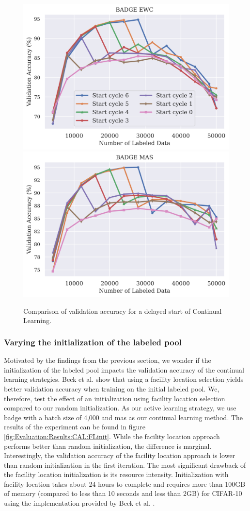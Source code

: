 \begin{figure}[h]
    \centering
    \includegraphics[width=0.45\linewidth]{images/results_CAL/delayed_start_badge_ewc.png} \hfill
    \includegraphics[width=0.45\linewidth]{images/results_CAL/delayed_start_badge_mas.png}
    \caption{Comparison of validation accuracy for a delayed start of Continual Learning.}
    \label{fig:Evaluation:CAL:DelayedStart}
\end{figure}

\subsubsection{Varying the initialization of the labeled pool}
\label{sec:Evaluation:CAL:Initialization}
Motivated by the findings from the previous section, we wonder if the initialization of the labeled pool impacts the validation accuracy of the continual learning strategies.
Beck et al. \cite{beck2021effective} show that using a facility location selection \cite{iyer2021submodular} yields better validation accuracy when training on the initial labeled pool.
We, therefore, test the effect of an initialization using facility location selection compared to our random initialization. As our active learning strategy, we use \gls{badge} with
a batch size of 4,000 and \gls{mas} as our continual learning method. The results of the experiment can be found in figure \ref{fig:Evaluation:Results:CAL:FLinit}. While the facility
location approach performs better than random initialization, the difference is marginal. Interestingly, the validation accuracy of the facility location approach is lower than
random initialization in the first iteration. The most significant drawback of the facility location initialization is its resource intensity. Initialization with facility
location takes about 24 hours to complete and requires more than 100GB of memory (compared to less than 10 seconds and less than 2GB) for CIFAR-10 using the implementation provided by Beck et al.
\cite{beck2021effective}. \par

